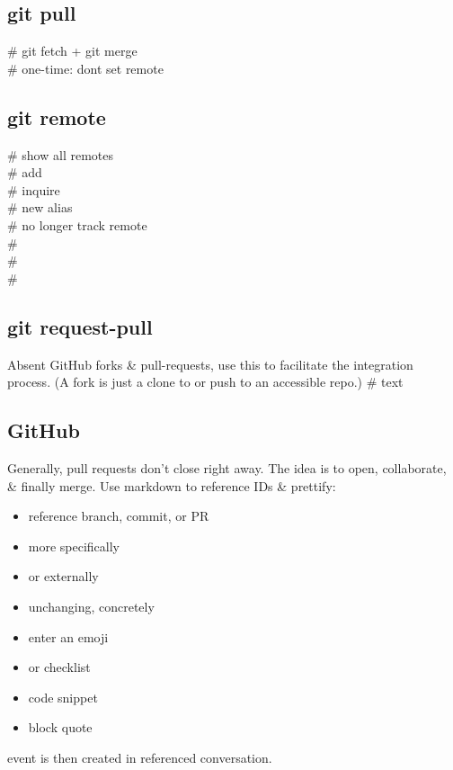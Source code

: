 \subsection*{git pull}
 \# git fetch + git merge \\
 \# one-time: don\textquotesingle t set remote\\


\subsection*{git remote}
 \# show all remotes \\
 \# add \\
 \# inquire \\
 \# new alias \\
 \# no longer track remote \\
 \# \\
 \# \\
 \# \\


\subsection*{git request-pull}
Absent GitHub forks \& pull-requests, use this to facilitate the integration process. (A fork is just a clone to or push to an accessible repo.)
 \# text\\

\subsection*{GitHub}
Generally, pull requests don't close right away.  
The idea is to open, collaborate, \& finally merge. Use markdown to reference IDs \& prettify:
{\scriptsize
\begin{itemize}
    \item {} reference branch, commit, or PR
    \item {} more specifically
    \item {} or externally
    \item {} unchanging, concretely
    \item {} enter an emoji
    \item {} or checklist
    \item {} code snippet
    \item {} block quote
\end{itemize}}

 event is then created in referenced 
conversation.
\ \\